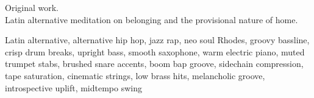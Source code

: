

\begin{notes}
Original work.\\
Latin alternative meditation on belonging and the provisional nature of home.
\end{notes}

\begin{style}
Latin alternative, alternative hip hop, jazz rap, neo soul Rhodes, groovy bassline, crisp drum breaks, upright bass, smooth saxophone, warm electric piano, muted trumpet stabs, brushed snare accents, boom bap groove, sidechain compression, tape saturation, cinematic strings, low brass hits, melancholic groove, introspective uplift, midtempo swing
\end{style}

